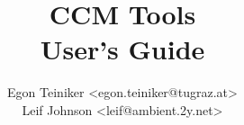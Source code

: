\documentclass{book}
\author{
  Egon Teiniker <egon.teiniker@tugraz.at>\\
  Leif Johnson <leif@ambient.2y.net>
}
\title{{\Huge CCM Tools}\\User's Guide}
\begin{document}
\maketitle
{}
\tableofcontents
\listoffigures

\newpage
{}
\setlength{\parskip}{1em}

%
%
%
%
%
%

\begin{appendix}
%
\end{appendix}



\end{document}
